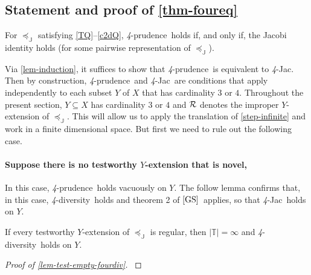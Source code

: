 \documentclass[12pt,a4paper,twoside]{article}
\makeatletter
\newcommand{\srcsize}{\@setfontsize{\srcsize}{3pt}{3pt}}
\newcommand{\gsii}{$\textup{[GS]}$}
\newcommand\mplus{\text{\srcsize$+$}}
\newcommand{\ext}{\mathrel{\mc R}}
\newcommand{\mbbc}{{\mathds C}}
\newcommand{\mbbt}{{\mathds {T}}}
\newcommand{\mbbj}{\mathds J}
\newcommand{\fourpru}{\textit{4}-\textup{prudence}}
\newcommand{\fourdiv}{\textit{4}-\textup{diversity}}
\newcommand{\fourjac}{\textup{\textit{4}-Jac}}
\makeatother
\begin{document}
\begin{appendices}
\section{Statement and proof of \cref{thm-foureq}}\label{sec-proof-foureq}
 \begin{theorem}\label{thm-foureq}
   For $\preceq_{\mbbj}$ satisfying \ref{TQ}--\ref{c2dQ}, \fourpru\ holds if,
   and only if, the Jacobi identity holds (for some pairwise representation of
   $\preceq_{\mbbj}$).
 \end{theorem}
 Via \cref{lem-induction}, it suffices to show that \fourpru\ is equivalent to
 \fourjac. Then by construction, \fourpru\ and \fourjac\ are conditions that
 apply independently to each subset $Y$ of $X$ that has cardinality $3$ or $4$.
 Throughout the present section, $Y\subseteq X$ has cardinality $3$ or $4$ and
 $\ext$ denotes the improper $Y$-extension of $\preceq_{\mbbj}$. This will allow
 us to apply the translation of \cref{step-infinite} and work in a finite
 dimensional space. But first we need to rule out the following case.
 \paragraph{Suppose there is no testworthy $Y$-extension that is
   novel,}\hskip-7pt In
 this case, \fourpru\ holds vacuously on $Y$. The follow lemma confirms that, in
 this case, \fourdiv\ holds and theorem 2 of \gsii\ applies, so that \fourjac\
 holds on $Y$.
\begin{lemma}\label{lem-test-empty-fourdiv}
  If every testworthy $Y$-extension of
  $\preceq_{\mbbj}$ is regular, then $\lvert \mbbt \rvert =
  \infty $ and \fourdiv\ holds on $Y$.
\end{lemma}

\begin{proof}[Proof of \cref{lem-test-empty-fourdiv}] \label{proof-test-empty-fourdiv}


\end{proof}
\end{appendices}
\end{document}
